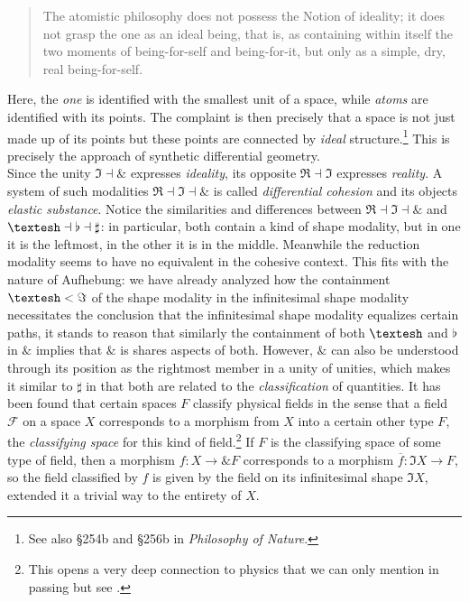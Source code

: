 \documentclass{article}
\begin{document}
\begin{quote}
    The atomistic philosophy does not possess the Notion of ideality; it does not grasp the one as an ideal being, that is, as containing within itself the two moments of being-for-self and being-for-it, but only as a simple, dry, real being-for-self.
\end{quote}

Here, the \emph{one} is identified with the smallest unit of a space, while \emph{atoms} are identified with
its points. The complaint is then precisely that a space is not just made up of its points but these points
are connected by \emph{ideal} structure.\footnote{See also §254b and §256b in \emph{Philosophy of Nature}.}
This is precisely the approach of synthetic differential geometry. \\

Since the unity $\Im\dashv\&$ expresses \emph{ideality}, its opposite $\Re\dashv\Im$ expresses
\emph{reality}. A system of such modalities $\Re\dashv\Im\dashv\&$ is called \emph{differential cohesion} and
its objects \emph{elastic substance}. Notice the similarities and differences between $\Re\dashv\Im\dashv\&$
and $\textrm{\textesh}\dashv\flat\dashv\sharp$: in particular, both contain a kind of shape modality, but in
one it is the leftmost, in the other it is in the middle. Meanwhile the reduction modality seems to have no
equivalent in the cohesive context. This fits with the nature of Aufhebung: we have already analyzed how the
containment $\textrm{\textesh}<\Im$ of the shape modality in the infinitesimal shape modality necessitates
the conclusion that the infinitesimal shape modality equalizes certain paths, it stands to reason that
similarly the containment of both $\textrm{\textesh}$ and $\flat$ in $\&$ implies that $\&$ is shares aspects
of both. However, $\&$ can also be understood through its position as the rightmost member in a unity of
unities, which makes it similar to $\sharp$ in that both are related to the \emph{classification} of
quantities. It has been found that certain spaces $F$ classify physical fields in the sense that a field
$\mathcal{F}$ on a space $X$ corresponds to a morphism from $X$ into a certain other type $F$, the
\emph{classifying space} for this kind of field.\footnote{This opens a very deep connection to physics that we
can only mention in passing but see \cite{dcct}.} If $F$ is the classifying space of some type of field,
then a morphism $f:X\rightarrow \& F$ corresponds to a morphism $\overline{f}:\Im X\rightarrow F$, so the
field classified by $f$ is given by the field on its infinitesimal shape $\Im X$, extended it a trivial way
to the entirety of $X$.   \\
\end{document}
